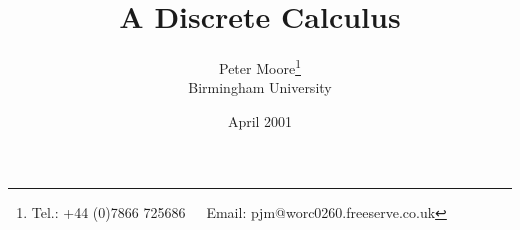 

\title{A Discrete Calculus}
\author{Peter Moore\thanks{Tel.: +44 (0)7866 725686\ \ \ Email: pjm@worc0260.freeserve.co.uk}\\
Birmingham University}
\date{April 2001}

%












